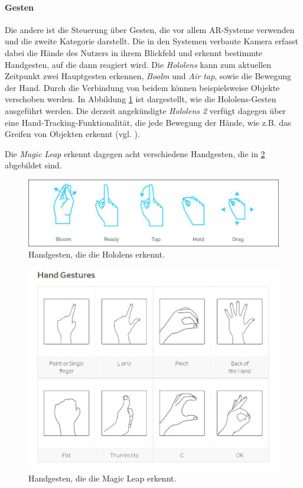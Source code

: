\paragraph{Gesten}
Die andere ist die Steuerung über Gesten, die vor allem AR-Systeme verwenden und die zweite Kategorie darstellt.
Die in den Systemen verbaute Kamera erfasst dabei die Hände des Nutzers in ihrem Blickfeld und erkennt bestimmte Handgesten, auf die dann reagiert wird. 
Die \textit{Hololens} kann zum aktuellen Zeitpunkt zwei Hauptgesten erkennen, \textit{Boolm} und \textit{Air tap}, sowie die Bewegung der Hand. Durch die Verbindung von beidem können beispielsweise Objekte verschoben werden. In Abbildung \ref{img:hololensGestures} ist dargestellt, wie die Hololens-Gesten ausgeführt werden. 
Die derzeit angekündigte \textit{Hololens 2} verfügt dagegen über eine Hand-Tracking-Funktionalität, die jede Bewegung der Hände, wie z.B. das Greifen von Objekten erkennt (vgl. \citet{hololens2}). 

Die \textit{Magic Leap} erkennt dagegen acht verschiedene Handgesten, die in \ref{img:magicGestures} abgebildet sind. 


\begin{figure}
	\centering
	\includegraphics[width=0.7\linewidth]{images/hololensGestures.png}
	\caption{Handgesten, die die Hololens erkennt.}
	\label{img:hololensGestures}
\end{figure}

\begin{figure}
	\centering
	\includegraphics[width=0.7\linewidth]{images/magicleapGestures.jpg}
	\caption{Handgesten, die die Magic Leap erkennt.}
	\label{img:magicGestures}
\end{figure}

